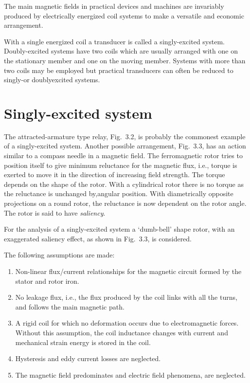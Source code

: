 \documentclass[a4paper,numbers=noenddot,12pt]{scrbook}
\begin{document}
The main magnetic fields in practical devices and machines are invariably produced by electrically energized coil systems to make a versatile and economic arrangement. 

With a single energized coil a transducer is called a singly-excited system. Doubly-excited systems have two coils which are usually arranged with one on the stationary member and one on the moving member. Systems with more than two coils may be employed but practical transducers can often be reduced to singly-or doubly­excited systems. 

\section{Singly-excited system} 
The attracted-armature type relay, Fig.\ 3.2, is probably the commonest example of a singly-excited system. Another possible arrangement, Fig.\ 3.3, has an action similar to a compass needle in a magnetic field. The ferromagnetic rotor tries to position itself to give minimum reluctance for the magnetic flux, i.e., torque is exerted to move it in the direction of increasing field strength. The torque depends on the shape of the rotor. With a cylindrical rotor there is no torque as the reluctance
is unchanged by,angular position. With diametrically opposite projections on a round rotor, the reluctance is now dependent on the rotor angle. The rotor is said to have 
\textit{saliency}.

For the analysis of a singly-excited system a `dumb-bell' shape rotor, with an exaggerated saliency effect, as shown in Fig.\ 3.3, is considered. 

The following assumptions are made:
\begin{enumerate}
    \item Non-linear flux/current relationships for the magnetic circuit formed by the stator and rotor iron.
    \item No leakage flux, i.e., the flux produced by the coil links with all the turns, and follows the main magnetic path.
    \item A rigid coil for which no deformation occurs due to electromagnetic forces. Without this assumption, the coil inductance changes with current and mechanical strain energy is stored in the coil.
    \item Hysteresis and eddy current losses are neglected.
    \item The magnetic field predominates and electric field phenomena, are neglected. 
\end{enumerate}
\end{document}
